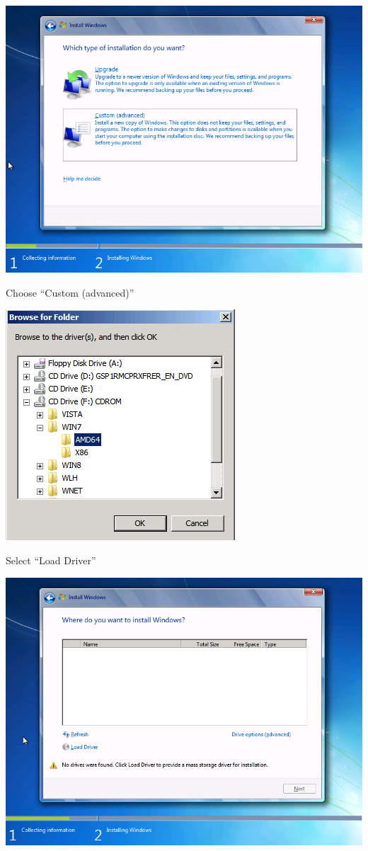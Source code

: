 \documentclass[letterpaper,10pt,english]{sphinxmanual}
\begin{document}
\begin{enumerate}
\includegraphics{win7_custom_install.png}

Choose “Custom (advanced)”

\includegraphics{win7_browse_folder.png}

Select “Load Driver”

\includegraphics{win7_load_driver.png}


\end{enumerate}
\end{document}
